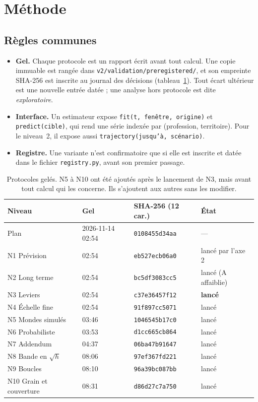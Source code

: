 \section{Méthode}\label{a3-sec:methode}
\subsection{Règles communes}
\begin{itemize}
  \item \textbf{Gel.} Chaque protocole est un rapport écrit avant tout calcul. Une copie immuable est
        rangée dans \texttt{v2/validation/preregistered/}, et son empreinte SHA-256 est inscrite au
        journal des décisions (tableau~\ref{a3-tab:sha}). Tout écart ultérieur est une nouvelle entrée
        datée ; une analyse hors protocole est dite \emph{exploratoire}.
  \item \textbf{Interface.} Un estimateur expose \texttt{fit(t, fenêtre, origine)} et
        \texttt{predict(cible)}, qui rend une série indexée par (profession, territoire). Pour le
        niveau~2, il expose aussi \texttt{trajectory(jusqu'à, scénario)}.
  \item \textbf{Registre.} Une variante n'est confirmatoire que si elle est inscrite et datée
        dans le fichier \texttt{registry.py}, avant son premier passage.
\end{itemize}

\begin{table}[h]
\centering\small
\begin{tabular}{@{}llll@{}}
\toprule
Niveau & Gel & SHA-256 (12 car.) & État \\
\midrule
Plan & 2026-11-14 02:54 & \texttt{0108455d34aa} & --- \\
N1 Prévision & 02:54 & \texttt{eb527ecb06a0} & lancé par l'axe 2 \\
N2 Long terme & 02:54 & \texttt{bc5df3083cc5} & lancé (A affaiblie) \\
N3 Leviers & 02:54 & \texttt{c37e36457f12} & \textbf{lancé} \\
N4 Échelle fine & 02:54 & \texttt{91f897cc5071} & lancé \\
N5 Mondes simulés & 03:46 & \texttt{1046545b17c0} & lancé \\
N6 Probabiliste & 03:53 & \texttt{d1cc665cb864} & lancé \\
N7 Addendum & 04:37 & \texttt{06ba47b91647} & lancé \\
N8 Bande en $\sqrt h$ & 08:06 & \texttt{97ef367fd221} & lancé \\
N9 Boucles & 08:10 & \texttt{96a39bc087bb} & lancé \\
N10 Grain et couverture & 08:31 & \texttt{d86d27c7a750} & lancé \\
\bottomrule
\end{tabular}
\caption{Protocoles gelés. N5 à N10 ont été ajoutés après le lancement de N3, mais avant tout
calcul qui les concerne. Ils s'ajoutent aux autres sans les modifier.}\label{a3-tab:sha}
\end{table}

